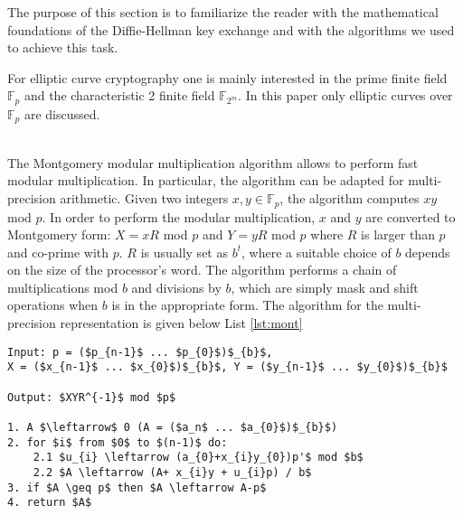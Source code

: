 The purpose of this section is to familiarize the reader with the mathematical foundations of the Diffie-Hellman key exchange and with the algorithms we used to achieve this task.

 For elliptic curve cryptography one is mainly interested in the prime finite field $\mathbb{F}_p$ and the characteristic 2 finite field $\mathbb{F}_{2^m}$. In this paper only elliptic curves over $\mathbb{F}_p$ are discussed.

\\The Montgomery modular multiplication algorithm allows to perform fast modular multiplication. In particular, the algorithm can be adapted for multi-precision arithmetic. Given two integers $x,y \in \mathbb{F}_p$, the algorithm computes $xy$ mod $p$. In order to perform the modular multiplication, $x$ and $y$ are converted to Montgomery form: $X = xR$ mod $p$ and $Y = yR$ mod $p$ where $R$ is larger than $p$ and co-prime with $p$. $R$ is usually set as  $b^{t}$, where a suitable choice of $b$ depends on the size of the processor's word. The algorithm performs a chain of multiplications mod $b$ and divisions by $b$, which are simply mask and shift operations when $b$ is in the appropriate form. The algorithm for the multi-precision representation is given below List \ref{lst:mont} \cite[p. 602]{Menezes:1996}
\begin{minipage}{\linewidth}
\begin{lstlisting}[frame=single, mathescape=true, captionpos=b, caption=Mulitprecision Montogmery Modular Multiplication,label=lst:mont ]
Input: p = ($p_{n-1}$ ... $p_{0}$)$_{b}$,
X = ($x_{n-1}$ ... $x_{0}$)$_{b}$, Y = ($y_{n-1}$ ... $y_{0}$)$_{b}$

Output: $XYR^{-1}$ mod $p$

1. A $\leftarrow$ 0 (A = ($a_n$ ... $a_{0}$)$_{b}$)
2. for $i$ from $0$ to $(n-1)$ do:
	2.1 $u_{i} \leftarrow (a_{0}+x_{i}y_{0})p'$ mod $b$
	2.2 $A \leftarrow (A+ x_{i}y + u_{i}p) / b$
3. if $A \geq p$ then $A \leftarrow A-p$
4. return $A$
\end{lstlisting}
\end{minipage}

